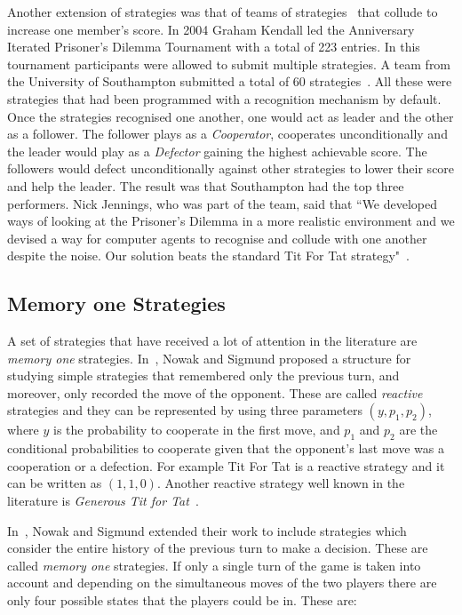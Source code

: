 Another extension of strategies was that of teams of
strategies~\cite{J.P.Delahaye1993Lp, J.P.Delahaye1995LIeP, A.Rogers2007Ctpw}
that collude to increase one member's score. In 2004 Graham Kendall led the
Anniversary Iterated Prisoner's Dilemma Tournament with a total of 223 entries.
In this tournament participants were allowed to submit multiple strategies. A
team from the University of Southampton submitted a total of 60
strategies~\cite{A.Rogers2007Ctpw}. All these were strategies that had been
programmed with a recognition mechanism by default. Once the strategies
recognised one another, one would act as leader and the other as a follower. The
follower plays as a \textit{Cooperator}, cooperates unconditionally and the
leader would play as a \textit{Defector} gaining the highest achievable score.
The followers would defect unconditionally against other strategies to lower
their score and help the leader. The result was that Southampton had the top
three performers. Nick Jennings, who was part of the team, said that ``We
developed ways of looking at the Prisoner's Dilemma in a more realistic
environment and we devised a way for computer agents to recognise and collude
with one another despite the noise. Our solution beats the standard Tit For Tat
strategy"~\cite{southampton_blog}.

\subsection{Memory one Strategies}\label{section:memory_one}

A set of strategies that have received a lot of attention in
the literature are \textit{memory one} strategies. In~\cite{Nowak1989},
Nowak and Sigmund proposed a structure for studying simple strategies that
remembered only the previous turn, and moreover, only recorded the move of the
opponent. These are called \textit{reactive} strategies and they can be
represented by using three parameters \((y, p_1, p_2)\), where \(y\) is the
probability to cooperate in the first move, and \(p_1\) and \(p_2\) are the
conditional probabilities to cooperate given that the opponent's last move was
a cooperation or a defection. For example Tit For Tat is a reactive strategy and
it can be written as \((1, 1, 0)\). Another reactive strategy well known in
the literature is \textit{Generous Tit for Tat}~\cite{Nowak1992}.

In~\cite{Nowak1990}, Nowak and Sigmund extended
their work to include strategies which consider the entire history of the previous turn to make a decision.
These are called \textit{memory one} strategies.
If only a single turn of the game is taken into account and depending on the
simultaneous moves of the two players there are only four possible states that
the players could be in. These are:

